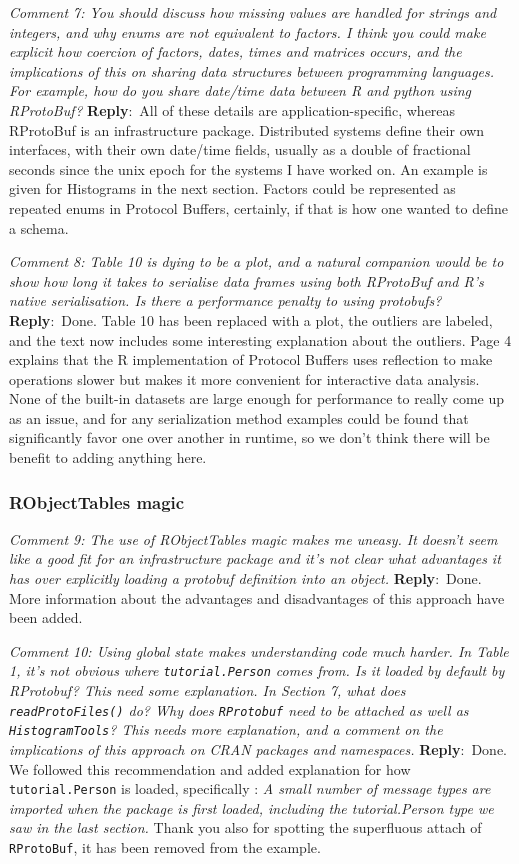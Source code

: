 \documentclass[10pt]{article}
\newcommand{\pointRaised}[2]{\smallskip %
  \textsl{{\fontseries{b}\selectfont #1}: #2}\newline}
\newcommand{\reply}[1]{\textbf{Reply}:\ #1 \smallskip } %
\begin{document}
\pointRaised{Comment 7}{You should discuss how missing values are handled for strings and
  integers, and why enums are not equivalent to factors. I think you
  could make explicit how coercion of factors, dates, times and matrices
  occurs, and the implications of this on sharing data structures
  between programming languages. For example, how do you share date/time
  data between R and python using RProtoBuf?}
\reply{All of these details are application-specific, whereas
  RProtoBuf is an infrastructure package.  Distributed systems define
  their own interfaces, with their own date/time fields, usually as
  a double of fractional seconds since the unix epoch for the systems I
  have worked on.  An example is given for Histograms in the next
  section.  Factors could be represented as repeated enums in Protocol
  Buffers, certainly, if that is how one wanted to define a schema.}

\pointRaised{Comment 8}{Table 10 is dying to be a plot, and a natural companion would be to
  show how long it takes to serialise data frames using both RProtoBuf
  and R's native serialisation. Is there a performance penalty to using
  protobufs?}
\reply{Done. Table 10 has been replaced with a plot, the outliers are
  labeled, and the text now includes some interesting explanation
  about the outliers.  Page 4 explains that the R implementation of
  Protocol Buffers uses reflection to make operations slower but makes
  it more convenient for interactive data analysis.  None of the
  built-in datasets are large enough for performance to really come up
  as an issue, and for any serialization method examples could be
  found that significantly favor one over another in runtime, so we
  don't think there will be benefit to adding anything here.  }

\subsubsection*{RObjectTables magic}

\pointRaised{Comment 9}{The use of RObjectTables magic makes me uneasy. It doesn't seem like a
  good fit for an infrastructure package and it's not clear what
  advantages it has over explicitly loading a protobuf definition into
  an object.}
\reply{Done. More information about the advantages and disadvantages of this
  approach have been added.}

\pointRaised{Comment 10}{Using global state makes understanding code much harder. In Table 1,
  it's not obvious where \texttt{tutorial.Person} comes from. Is it loaded by
  default by RProtobuf? This need some explanation. In Section 7, what
  does \texttt{readProtoFiles()} do? Why does \texttt{RProtobuf} need to be attached
  as well as \texttt{HistogramTools}? This needs more explanation, and a
  comment on the implications of this approach on CRAN packages and
  namespaces.}
\reply{Done. We followed this recommendation and added explanation for how
  \texttt{tutorial.Person} is loaded, specifically : \emph{A small number of message types are imported when the
    package is first loaded, including the tutorial.Person type we saw in
    the last section.}  Thank you also for spotting the superfluous attach
  of \texttt{RProtoBuf}, it has been removed from the example.}
\end{document}

